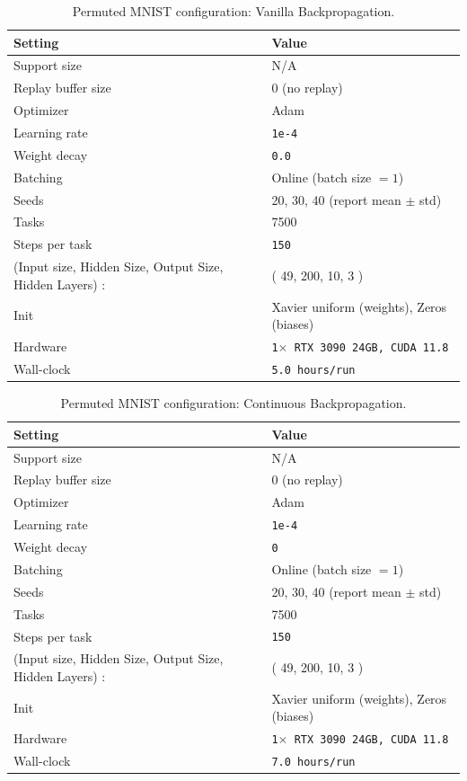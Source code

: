 \documentclass{article}
\begin{document}
\begin{table}[H]
\centering
\footnotesize
\caption{Permuted MNIST configuration: Vanilla Backpropagation.}
\label{tab:pmnist_bp}
\begin{tabular}{@{}ll@{}}
\toprule
Setting & Value \\ \midrule
Support size & N/A \\
Replay buffer size & 0 (no replay) \\
Optimizer & Adam \\
Learning rate & \texttt{1e-4} \\
Weight decay & \texttt{0.0} \\
Batching & Online (batch size $=1$) \\
Seeds & 20, 30, 40 (report mean $\pm$ std) \\
Tasks & 7500 \\
Steps per task & \texttt{150} \\
(Input size, Hidden Size, Output Size, Hidden Layers) : & ( 49, 200, 10, 3 ) \\ 
Init &  Xavier uniform (weights), Zeros (biases) \\
Hardware & \texttt{1$\times$ RTX 3090 24GB, CUDA 11.8} \\
Wall-clock & \texttt{5.0 hours/run} \\
\bottomrule
\end{tabular}
\end{table}

\begin{table}[H]
\centering
\footnotesize
\caption{Permuted MNIST configuration: Continuous Backpropagation.}
\label{tab:pmnist_bp}
\begin{tabular}{@{}ll@{}}
\toprule
Setting & Value \\ \midrule
Support size & N/A \\
Replay buffer size & 0 (no replay) \\
Optimizer & Adam  \\
Learning rate & \texttt{1e-4} \\
Weight decay & \texttt{0} \\
Batching & Online (batch size $=1$) \\
Seeds & 20, 30, 40 (report mean $\pm$ std) \\
Tasks & 7500 \\
Steps per task & \texttt{150} \\
(Input size, Hidden Size, Output Size, Hidden Layers) : & ( 49, 200, 10, 3 ) \\ 
Init &  Xavier uniform (weights), Zeros (biases)\\
Hardware & \texttt{1$\times$ RTX 3090 24GB, CUDA 11.8} \\
Wall-clock & \texttt{7.0 hours/run} \\
\bottomrule
\end{tabular}
\end{table}
\end{document}

